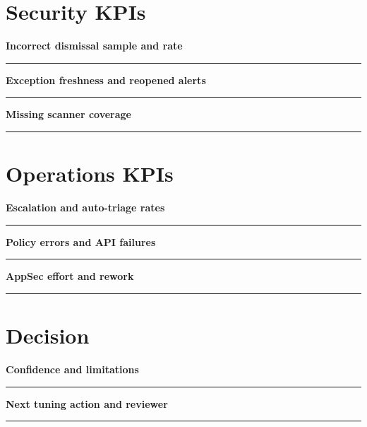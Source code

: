 \documentclass[11pt,letterpaper]{article}
\begin{document}
\section{Security KPIs}
\noindent\textbf{Incorrect dismissal sample and rate}\par
\vspace{1.1em}\noindent\rule{0.96\linewidth}{0.4pt}\par\vspace{0.65em}
\noindent\textbf{Exception freshness and reopened alerts}\par
\vspace{1.1em}\noindent\rule{0.96\linewidth}{0.4pt}\par\vspace{0.65em}
\noindent\textbf{Missing scanner coverage}\par
\vspace{1.1em}\noindent\rule{0.96\linewidth}{0.4pt}\par\vspace{0.65em}
\section{Operations KPIs}
\noindent\textbf{Escalation and auto-triage rates}\par
\vspace{1.1em}\noindent\rule{0.96\linewidth}{0.4pt}\par\vspace{0.65em}
\noindent\textbf{Policy errors and API failures}\par
\vspace{1.1em}\noindent\rule{0.96\linewidth}{0.4pt}\par\vspace{0.65em}
\noindent\textbf{AppSec effort and rework}\par
\vspace{1.1em}\noindent\rule{0.96\linewidth}{0.4pt}\par\vspace{0.65em}
\section{Decision}
\noindent\textbf{Confidence and limitations}\par
\vspace{1.1em}\noindent\rule{0.96\linewidth}{0.4pt}\par\vspace{0.65em}
\noindent\textbf{Next tuning action and reviewer}\par
\vspace{1.1em}\noindent\rule{0.96\linewidth}{0.4pt}\par\vspace{0.65em}
\end{document}
